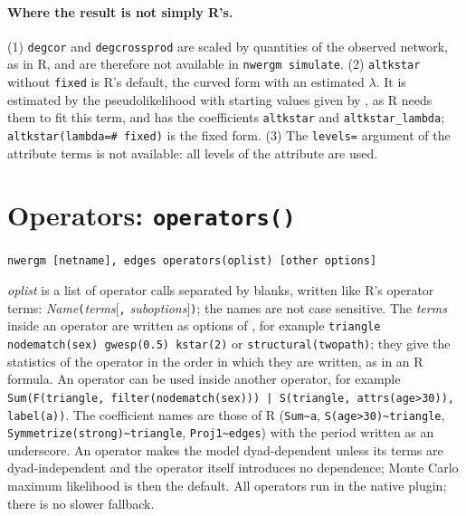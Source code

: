 \paragraph{Where the result is not simply R's.} (1) \texttt{degcor} and \texttt{degcrossprod} are scaled by quantities of the observed network, as in R, and are therefore not available in \texttt{nwergm simulate}. (2) \texttt{altkstar} without \texttt{fixed} is R's default, the curved form with an estimated $\lambda$. It is estimated by the pseudolikelihood with starting values given by , as R needs them to fit this term, and has the coefficients \texttt{altkstar} and \texttt{altkstar\_lambda}; \texttt{altkstar(lambda=\emph{\#} fixed)} is the fixed form. (3) The \texttt{levels=} argument of the attribute terms is not available: all levels of the attribute are used.

\section{Operators: \texttt{operators()}}\label{sec:operators}

\begin{lstlisting}
nwergm [netname], edges operators(oplist) [other options]
\end{lstlisting}
\emph{oplist} is a list of operator calls separated by blanks, written like R's operator terms: \emph{Name}\texttt{(}\emph{terms}[\texttt{,} \emph{suboptions}]\texttt{)}; the names are not case sensitive. The \emph{terms} inside an operator are written as options of \nwergm{}, for example \texttt{triangle nodematch(sex) gwesp(0.5) kstar(2)} or \texttt{structural(twopath)}; they give the statistics of the operator in the order in which they are written, as in an R formula. An operator can be used inside another operator, for example \texttt{Sum(F(triangle, filter(nodematch(sex))) | S(triangle, attrs(age>30)), label(a))}. The coefficient names are those of R (\texttt{Sum\~{}a}, \texttt{S(age>30)\~{}triangle}, \texttt{Symmetrize(strong)\~{}triangle}, \texttt{Proj1\~{}edges}) with the period written as an underscore. An operator makes the model dyad-dependent unless its terms are dyad-independent and the operator itself introduces no dependence; Monte Carlo maximum likelihood is then the default. All operators run in the native plugin; there is no slower fallback.

